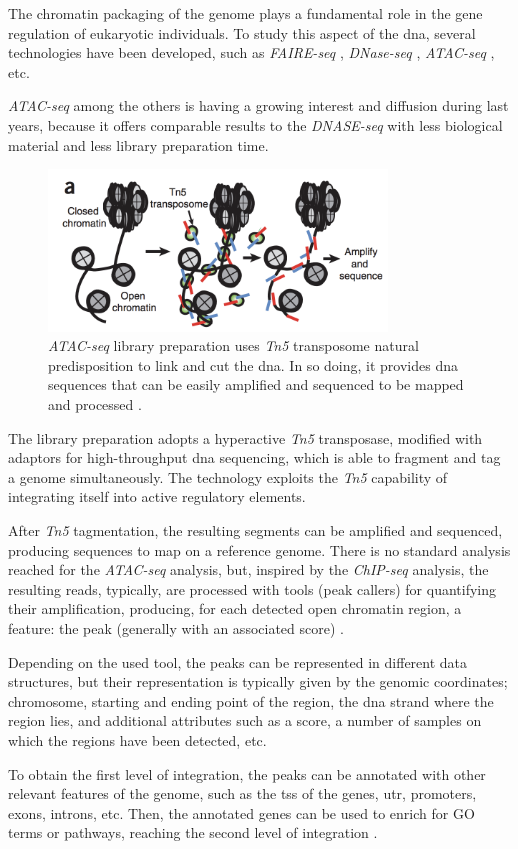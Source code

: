 The chromatin packaging of the genome plays a fundamental role in the gene regulation of eukaryotic individuals.
To study this aspect of the \gls{dna}, several technologies have been developed, such as \textit{FAIRE-seq} \cite{Giresi2007}, \textit{DNase-seq} \cite{Winter2013}, \textit{ATAC-seq} \cite{Buenrostro2013}, etc.

\textit{ATAC-seq} among the others is having a growing interest and diffusion during last years, because it offers comparable results to the \textit{DNASE-seq} with less biological material and less library preparation time.

\begin{figure}[h]
\centering
\includegraphics[width=9cm,keepaspectratio]{img/intro/atac.png}
\caption[ATAC-seq experiment]{\textit{ATAC-seq } library preparation uses \textit{Tn5} transposome natural predisposition to link and cut the \gls{dna}. In so doing, it provides \gls{dna} sequences that can be easily amplified and sequenced to be mapped and processed \cite{Buenrostro2013}.}
\label{fig:atacseqexp}
\end{figure}

The library preparation adopts a hyperactive \textit{Tn5} transposase, modified with adaptors for high-throughput  \gls{dna} sequencing, which is able to fragment and tag a genome simultaneously.
The technology exploits the \textit{Tn5} capability of integrating itself into active regulatory elements.

After \textit{Tn5} tagmentation, the resulting segments can be amplified and sequenced, producing sequences to map on a reference genome.
There is no standard analysis reached for the \textit{ATAC-seq} analysis, but, inspired by the \textit{ChIP-seq} analysis, the resulting reads, typically, are processed with tools (peak callers) for quantifying their amplification, producing, for each detected open chromatin region, a feature: the peak (generally with an associated score) \cite{Wei2018}.

Depending on the used tool, the peaks can be represented in different data structures, but their representation is typically given by the genomic coordinates; chromosome, starting and ending point of the region, the \gls{dna} strand where the region lies, and additional attributes such as a score, a number of samples on which the regions have been detected, etc.

To obtain the first level of integration, the peaks can be annotated with other relevant features of the genome, such as the \gls{tss} of the genes, \gls{utr}, promoters, exons, introns, etc.  
Then, the annotated genes can be used to enrich for GO terms or pathways, reaching the second level of integration \cite{righelli2018, Koberstein2018, Ou2018}.




